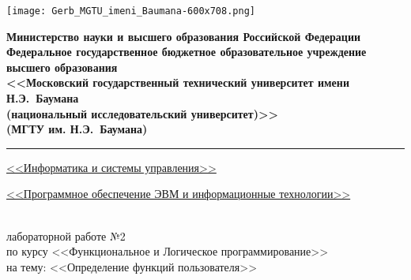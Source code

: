 \clearpage

\thispagestyle{fancy}
\renewcommand{\headrulewidth}{0pt}
\fancyhead{}

{
    \linespread{1}

    \noindent\begin{minipage}{0.12\textwidth}
        \texttt{[image: Gerb\_MGTU\_imeni\_Baumana-600x708.png]}
    \end{minipage}
    \hfill
    \noindent\begin{minipage}{0.83\textwidth}\centering
        \centering
        \small
        \bfseries
        Министерство науки и высшего образования Российской Федерации\\
        Федеральное государственное бюджетное образовательное учреждение высшего образования\\
        <<Московский государственный технический университет имени Н.Э.~Баумана\\
        (национальный исследовательский университет)>>\\
        (МГТУ им. Н.Э.~Баумана)
    \end{minipage}
}

\noindent\rule{\linewidth}{3pt}

{
\small
{} \uline{\hfill<<Информатика и системы управления>>\hfill}

 \uline{\hfill<<Программное обеспечение ЭВМ и информационные технологии>>\hfill}
}

\vspace{7\baselineskip}

\begin{center}
    {\Large{}} \\
    { лабораторной работе №2} \\
    по курсу <<Функциональное и Логическое программирование>> \\
    на тему: <<Определение функций пользователя>> \\
\end{center}

\vspace{6\baselineskip}


